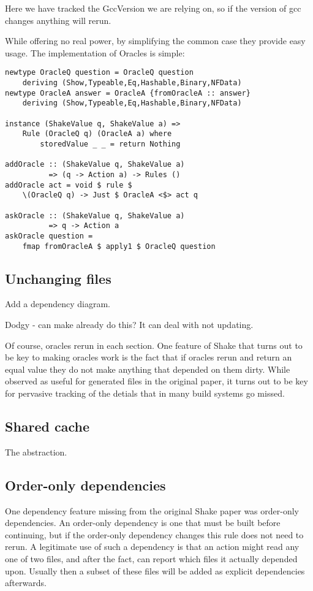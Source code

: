 Here we have tracked the GccVersion we are relying on, so if the version of gcc changes anything will rerun.

While offering no real power, by simplifying the common case they provide easy usage. The implementation of Oracles is simple:

\begin{lstlisting}
newtype OracleQ question = OracleQ question
    deriving (Show,Typeable,Eq,Hashable,Binary,NFData)
newtype OracleA answer = OracleA {fromOracleA :: answer}
    deriving (Show,Typeable,Eq,Hashable,Binary,NFData)

instance (ShakeValue q, ShakeValue a) =>
    Rule (OracleQ q) (OracleA a) where
        storedValue _ _ = return Nothing

addOracle :: (ShakeValue q, ShakeValue a)
          => (q -> Action a) -> Rules ()
addOracle act = void $ rule $
    \(OracleQ q) -> Just $ OracleA <$> act q

askOracle :: (ShakeValue q, ShakeValue a)
          => q -> Action a
askOracle question =
    fmap fromOracleA $ apply1 $ OracleQ question
\end{lstlisting}

\subsection{Unchanging files}

Add a dependency diagram.

Dodgy - can make already do this? It can deal with not updating.

Of course, oracles rerun in each section. One feature of Shake that turns out to be key to making oracles work is the fact that if oracles rerun and return an equal value they do not make anything that depended on them dirty. While observed as useful for generated files in the original paper, it turns out to be key for pervasive tracking of the detials that in many build systems go missed.

\subsection{Shared cache}

The abstraction.

\subsection{Order-only dependencies}

One dependency feature missing from the original Shake paper was order-only dependencies. An order-only dependency is one that must be built before continuing, but if the order-only dependency changes this rule does not need to rerun. A legitimate use of such a dependency is that an action might read any one of two files, and after the fact, can report which files it actually depended upon. Usually then a subset of these files will be added as explicit dependencies afterwards.

